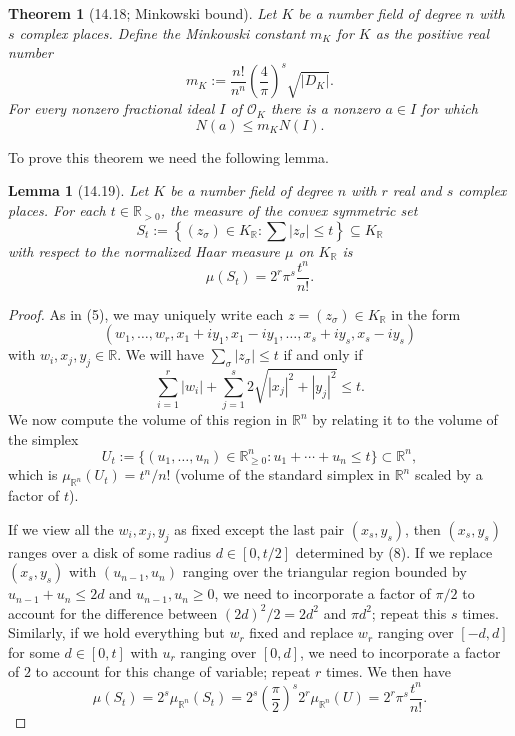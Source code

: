 \documentclass[UTF8,11pt]{ctexart}
\newtheorem*{theorem}{Theorem}
\newtheorem*{lemma}{Lemma}
\begin{document}
\begin{theorem}[14.18; Minkowski bound]
Let $K$ be a number field of degree $n$ with $s$ complex places. Define the Minkowski constant $m_K$ for $K$ as the positive real number
\[
m_K:=\frac{n!}{n^n}\left(\frac4\pi\right)^s\sqrt{|D_K|}.
\]
For every nonzero fractional ideal $I$ of $\mathcal O_K$ there is a nonzero $a\in I$ for which
\[
N(a)\le m_KN(I).
\]
\end{theorem}
To prove this theorem we need the following lemma.

\begin{lemma}[14.19]
Let $K$ be a number field of degree $n$ with $r$ real and $s$ complex places. For each $t\in\mathbb R_{>0}$, the measure of the convex symmetric set
\[
S_t:=\left\{(z_\sigma)\in K_{\mathbb R}:\sum|z_\sigma|\le t\right\}\subseteq K_{\mathbb R}
\]
with respect to the normalized Haar measure $\mu$ on $K_{\mathbb R}$ is
\[
\mu(S_t)=2^r\pi^s\frac{t^n}{n!}.
\]
\end{lemma}
\begin{proof}
As in (5), we may uniquely write each $z=(z_\sigma)\in K_{\mathbb R}$ in the form
\[
(w_1,\ldots,w_r,x_1+iy_1,x_1-iy_1,\ldots,x_s+iy_s,x_s-iy_s)
\]
with $w_i,x_j,y_j\in\mathbb R$. We will have $\sum_\sigma|z_\sigma|\le t$ if and only if
\[
\sum_{i=1}^r|w_i|+\sum_{j=1}^s2\sqrt{|x_j|^2+|y_j|^2}\le t.\tag{8}
\]
We now compute the volume of this region in $\mathbb R^n$ by relating it to the volume of the simplex
\[
U_t:=\{(u_1,\ldots,u_n)\in\mathbb R_{\ge0}^n:u_1+\cdots+u_n\le t\}\subset\mathbb R^n,
\]
which is $\mu_{\mathbb R^n}(U_t)=t^n/n!$ (volume of the standard simplex in $\mathbb R^n$ scaled by a factor of $t$).

If we view all the $w_i,x_j,y_j$ as fixed except the last pair $(x_s,y_s)$, then $(x_s,y_s)$ ranges over a disk of some radius $d\in[0,t/2]$ determined by (8). If we replace $(x_s,y_s)$ with $(u_{n-1},u_n)$ ranging over the triangular region bounded by $u_{n-1}+u_n\le2d$ and $u_{n-1},u_n\ge0$, we need to incorporate a factor of $\pi/2$ to account for the difference between $(2d)^2/2=2d^2$ and $\pi d^2$; repeat this $s$ times. Similarly, if we hold everything but $w_r$ fixed and replace $w_r$ ranging over $[-d,d]$ for some $d\in[0,t]$ with $u_r$ ranging over $[0,d]$, we need to incorporate a factor of $2$ to account for this change of variable; repeat $r$ times. We then have
\[
\mu(S_t)=2^s\mu_{\mathbb R^n}(S_t)=2^s\left(\frac\pi2\right)^s2^r\mu_{\mathbb R^n}(U)=2^r\pi^s\frac{t^n}{n!}.
\]
\end{proof}
\end{document}
